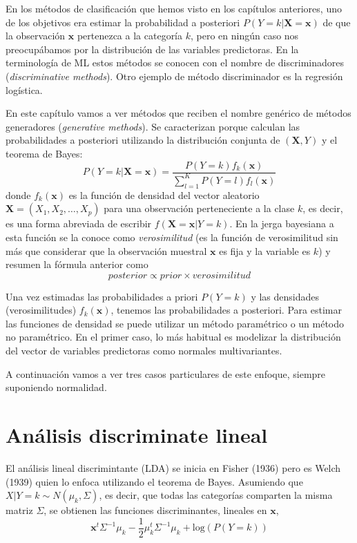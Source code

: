 \documentclass[
]{book}
\theoremstyle{break}
\theoremstyle{definition}
\theoremstyle{definition}
\theoremstyle{definition}
\theoremstyle{remark}
\begin{document}
En los métodos de clasificación que hemos visto en los capítulos anteriores, uno de los objetivos era estimar la probabilidad a posteriori \(P(Y = k | \mathbf{X}=\mathbf{x})\) de que la observación \(\mathbf{x}\) pertenezca a la categoría \(k\), pero en ningún caso nos preocupábamos por la distribución de las variables predictoras. En la terminología de ML estos métodos se conocen con el nombre de discriminadores (\emph{discriminative methods}). Otro ejemplo de método discriminador es la regresión logística.

En este capítulo vamos a ver métodos que reciben el nombre genérico de métodos generadores (\emph{generative methods}). Se caracterizan porque calculan las probabilidades a posteriori utilizando la distribución conjunta de \((\mathbf{X}, Y)\) y el teorema de Bayes:
\[P(Y = k | \mathbf{X}=\mathbf{x}) = \frac{P(Y = k) f_k(\mathbf{x})}{\sum_{l=1}^K P(Y = l) f_l(\mathbf{x})}\]
donde \(f_k(\mathbf{x})\) es la función de densidad del vector aleatorio \(\mathbf{X}=(X_1, X_2, \ldots, X_p)\) para una observación perteneciente a la clase \(k\), es decir, es una forma abreviada de escribir \(f(\mathbf{X}=\mathbf{x} | Y = k)\). En la jerga bayesiana a esta función se la conoce como \emph{verosimilitud} (es la función de verosimilitud sin más que considerar que la observación muestral \(\mathbf{x}\) es fija y la variable es \(k\)) y resumen la fórmula anterior como
\[posterior \propto prior \times verosimilitud\]

Una vez estimadas las probabilidades a priori \(P(Y = k)\) y las densidades (verosimilitudes) \(f_k(\mathbf{x})\), tenemos las probabilidades a posteriori. Para estimar las funciones de densidad se puede utilizar un método paramétrico o un método no paramétrico. En el primer caso, lo más habitual es modelizar la distribución del vector de variables predictoras como normales multivariantes.

A continuación vamos a ver tres casos particulares de este enfoque, siempre suponiendo normalidad.

\hypertarget{anuxe1lisis-discriminate-lineal}{%
\section{Análisis discriminate lineal}\label{anuxe1lisis-discriminate-lineal}}

El análisis lineal discrimintante (LDA) se inicia en Fisher (1936) pero es Welch (1939) quien lo enfoca utilizando el teorema de Bayes. Asumiendo que \(X | Y = k \sim N(\mu_k, \Sigma)\), es decir, que todas las categorías comparten la misma matriz \(\Sigma\), se obtienen las funciones discriminantes, lineales en \(\mathbf{x}\),
\[\mathbf{x}^t \Sigma^{-1} \mu_k - \frac{1}{2} \mu_k^t \Sigma^{-1} \mu_k + \mbox{log}(P(Y = k))
\]
\end{document}
